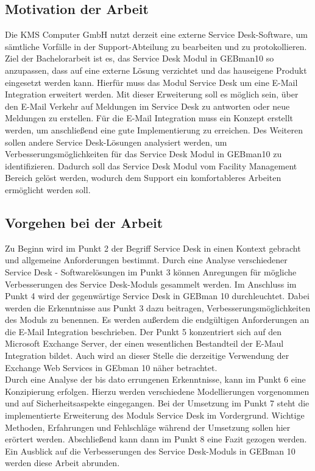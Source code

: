 \subsection{Motivation der Arbeit}
\noindent
Die KMS Computer GmbH nutzt derzeit eine externe Service Desk-Software, um sämtliche Vorfälle in der Support-Abteilung zu bearbeiten und zu protokollieren. Ziel der Bachelorarbeit ist es, das Service Desk Modul in GEBman10 so anzupassen, dass auf eine externe Lösung verzichtet und das hauseigene Produkt eingesetzt werden kann. Hierfür muss das Modul Service Desk um eine E-Mail Integration erweitert werden. Mit dieser Erweiterung soll es möglich sein, über den E-Mail Verkehr auf Meldungen im Service Desk zu antworten oder neue Meldungen zu erstellen. Für die E-Mail Integration muss ein Konzept erstellt werden, um anschließend eine gute Implementierung zu erreichen.\newline
Des Weiteren sollen andere Service Desk-Lösungen analysiert werden, um Verbesserungsmöglichkeiten für das Service Desk Modul in GEBman10 zu identifizieren. Dadurch soll das Service Desk Modul vom Facility Management Bereich gelöst werden, wodurch dem Support ein komfortableres Arbeiten ermöglicht werden soll.\\


\subsection{Vorgehen bei der Arbeit}
\noindent
Zu Beginn wird im Punkt 2 der Begriff Service Desk in einen Kontext gebracht und allgemeine Anforderungen bestimmt. Durch eine Analyse verschiedener Service Desk - Softwarelösungen im Punkt 3 können Anregungen für mögliche Verbesserungen des Service Desk-Moduls gesammelt werden. Im Anschluss im Punkt 4 wird der gegenwärtige Service Desk in GEBman 10 durchleuchtet. Dabei werden die Erkenntnisse aus Punkt 3 dazu beitragen, Verbesserungsmöglichkeiten des Moduls zu benennen. Es werden außerdem die endgültigen Anforderungen an die E-Mail Integration beschrieben. Der Punkt 5 konzentriert sich auf den Microsoft Exchange Server, der einen wesentlichen Bestandteil der E-Maul Integration bildet. Auch wird an dieser Stelle die derzeitige Verwendung der Exchange Web Services in GEbman 10 näher betrachtet.\\

\noindent
Durch eine Analyse der bis dato errungenen Erkenntnisse, kann im Punkt 6 eine Konzipierung erfolgen. Hierzu werden verschiedene Modellierungen vorgenommen und auf Sicherheitsaspekte eingegangen. Bei der Umsetzung im Punkt 7 steht die implementierte Erweiterung des Moduls Service Desk im Vordergrund. Wichtige Methoden, Erfahrungen und Fehlschläge während der Umsetzung sollen hier erörtert werden. Abschließend kann dann im Punkt 8 eine Fazit gezogen werden. Ein Ausblick auf die Verbesserungen des Service Desk-Moduls in GEBman 10 werden diese Arbeit abrunden.